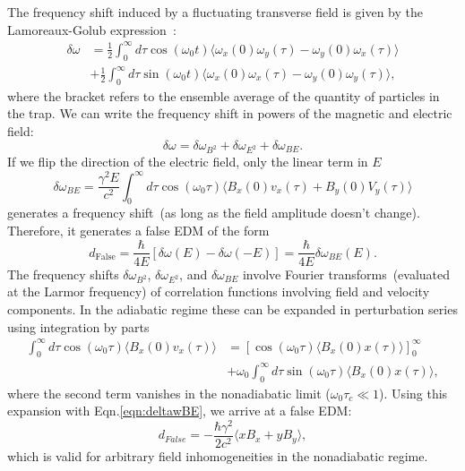 The frequency shift induced by a fluctuating transverse field is given
by the Lamoreaux-Golub expression~\cite{LamGol2005}:
%
\begin{align}
  \delta \omega &= \frac{1}{2}\int_{0}^{\infty}d\tau \cos(\omega_0 t) \langle\omega_x(0) \omega_y(\tau) - \omega_y(0) \omega_x(\tau)\rangle \\ \nonumber
  &+ \frac{1}{2}\int_{0}^{\infty}d\tau \sin(\omega_0 t) \langle\omega_x(0) \omega_x(\tau) - \omega_y(0) \omega_y(\tau)\rangle ,
\end{align}
%
where the bracket refers to the ensemble average of the quantity of
particles in the trap.
We can write the frequency shift in powers of the magnetic and electric field:
%
\begin{equation}
\delta \omega = \delta \omega_{B^2} + \delta \omega_{E^2} + \delta \omega_{BE}.
\end{equation}
%
If we flip the direction of the electric field, only the linear term in $E$ 
%
\begin{equation}
\label{eqn:deltawBE}
\delta \omega_{BE} = \frac{\gamma^2 E}{c^2} \int_{0}^{\infty} d\tau \cos(\omega_0 \tau) \langle B_x(0) v_x(\tau) + B_y(0) V_y(\tau)\rangle
\end{equation}
%
generates a frequency shift~(as long as the field amplitude doesn't
change).  Therefore, it generates a false EDM of the form
%
\begin{equation}
d_\mathrm{False} = \frac{\hbar}{4E}[\delta \omega(E) - \delta \omega (-E)] = \frac{\hbar}{4E}\delta \omega_{BE}(E).
\end{equation}
%
The frequency shifts $\delta \omega_{B^2}$, $\delta \omega_{E^2}$, and
$\delta \omega_{BE}$ involve Fourier transforms~(evaluated at the
Larmor frequency) of correlation functions involving field and
velocity components.  In the adiabatic regime these can be expanded in
perturbation series using integration by parts
%
\begin{align}
  \int_{0}^{\infty} d\tau \cos(\omega_0 \tau)\langle B_x(0) v_x(\tau)\rangle &= [\cos(\omega_0 \tau)\langle B_x(0)x(\tau)\rangle]_{0}^{\infty} \\ \nonumber
  &+ \omega_0 \int_{0}^{\infty} d\tau \sin(\omega_0 \tau)\langle B_x(0) x(\tau)\rangle ,
\end{align}
%
where the second term vanishes in the nonadiabatic limit
($\omega_0 \tau_c \ll 1$).  Using this expansion with
Eqn.\ref{eqn:deltawBE}, we arrive at a false EDM:
%
\begin{equation}
d_{False} = - \frac{\hbar \gamma^2}{2 c^2} \langle x B_x + y B_y \rangle,
\end{equation}
%
which is valid for arbitrary field inhomogeneities in the nonadiabatic
regime.


